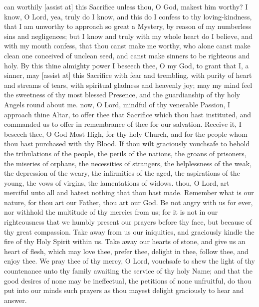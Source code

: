  can worthily [assist at] this Sacrifice unless thou, O God, makest him worthy? I know, O Lord, yea, truly do I know, and this do I confess to thy loving-kindness, that I am unworthy to approach so great a Mystery, by reason of my numberless sins and negligences; but I know and truly with my whole heart do I believe, and with my mouth confess, that thou canst make me worthy, who alone canst make clean one conceived of unclean seed, and canst make sinners to be righteous and holy. By this thine almighty power I beseech thee, O my God, to grant that I, a sinner, may [assist at] this Sacrifice with fear and trembling, with purity of heart and streams of tears, with spiritual gladness and heavenly joy; may my mind feel the sweetness of thy most blessed Presence, and the guardianship of thy holy Angels round about me.
 now, O Lord, mindful of thy venerable Passion, I approach thine Altar, to offer thee that Sacrifice which thou hast instituted, and commanded us to offer in remembrance of thee for our salvation. Receive it, I beseech thee, O God Most High, for thy holy Church, and for the people whom thou hast purchased with thy Blood. If thou wilt graciously vouchsafe to behold %
the tribulations of the people, the perils of the nations, the groans of prisoners, the miseries of orphans, the necessities of strangers, the helplessness of the weak, the depression of the weary, the infirmities of the aged, the aspirations of the young, the vows of virgins, the lamentations of widows.
 thou, O Lord, art merciful unto all and hatest nothing that thou hast made. Remember what is our nature, for thou art our Father, thou art our God. Be not angry with us for ever, nor withhold the multitude of thy mercies from us; for it is not in our righteousness that we humbly present our prayers before thy face, but because of thy great compassion. Take away from us our iniquities, and graciously kindle the fire of thy Holy Spirit within us. Take away our hearts of stone, and give us an heart of flesh, which may love thee, prefer thee, delight in thee, follow thee, and enjoy thee. We pray thee of thy mercy, O Lord, vouchsafe to shew the light of thy countenance unto thy family awaiting the service of thy holy Name; and that the good desires of none may be ineffectual, the petitions of none unfruitful, do thou put into our minds such prayers as thou mayest delight graciously to hear and answer. 

